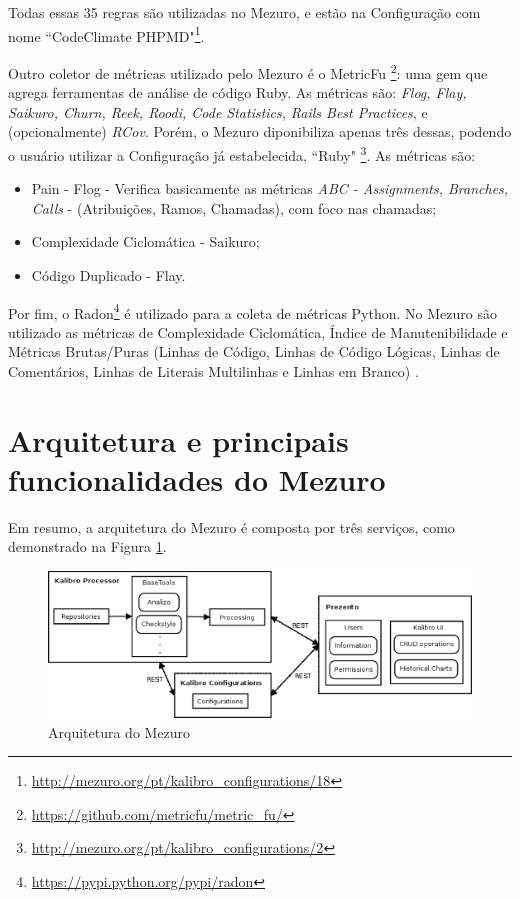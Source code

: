 Todas essas 35 regras são utilizadas no Mezuro, e estão na Configuração com nome
``CodeClimate PHPMD"\footnote{\url{http://mezuro.org/pt/kalibro_configurations/18}}.

Outro coletor de métricas utilizado pelo Mezuro é o MetricFu
\footnote{\url{https://github.com/metricfu/metric_fu/}}: uma gem que agrega
ferramentas de análise de código Ruby. As métricas são: \textit{Flog, Flay,
Saikuro, Churn, Reek, Roodi, Code Statistics,} \textit{Rails Best Practices}, e
(opcionalmente) \textit{RCov}. Porém, o Mezuro diponibiliza apenas três dessas,
podendo o usuário utilizar a Configuração já estabelecida, ``Ruby"
\footnote{\url{http://mezuro.org/pt/kalibro_configurations/2}}.
%
As métricas são\cite{rubySadist}:

\begin{itemize}
  \item Pain - Flog - Verifica basicamente as métricas \textit{ABC - Assignments,
        Branches, Calls} - (Atribuições, Ramos, Chamadas), com foco nas chamadas;
  \item Complexidade Ciclomática - Saikuro;
  \item Código Duplicado - Flay.
\end{itemize}

Por fim, o Radon\footnote{\url{https://pypi.python.org/pypi/radon}} é utilizado
para a coleta de métricas Python. No Mezuro são utilizado as métricas de
Complexidade Ciclomática, Índice de Manutenibilidade e Métricas Brutas/Puras
(Linhas de Código, Linhas de Código Lógicas, Linhas de Comentários, Linhas de
Literais Multilinhas e Linhas em Branco) \cite{radonDoc}.

\section{Arquitetura e principais funcionalidades do Mezuro}


Em resumo, a arquitetura do Mezuro é composta por três serviços, como
demonstrado na Figura \ref{fig:mezuroNoosferoArch}.

\begin{figure}[!htb]
	\centering
    \includegraphics[keepaspectratio=true,scale=0.5]
    {figuras/mezuroCloudArch.eps}
  \caption{Arquitetura do Mezuro \cite{camarinhaOSS2015}}
	\label{fig:mezuroNoosferoArch}
\end{figure}

